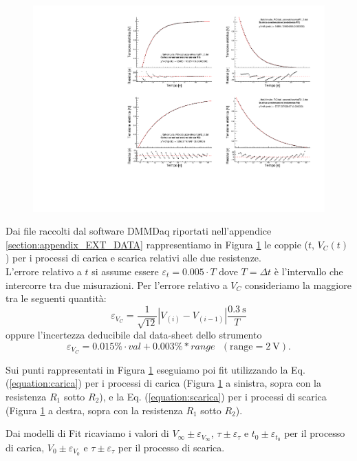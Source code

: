 \documentclass[italian, a4paper, 10pt, twocolumn]{../../style/lab_unige}
\newcommand{\reffig}[1]{Figura {\ref{#1}}}%
\newcommand{\refeqn}[1]{Eq. ({\ref{#1}})}%
\newcommand{\mstdErr}[1]{\varepsilon_{#1}}
\begin{document}
    \begin{figure}[t!]
        \centering
        \includegraphics[width=\linewidth]{plot_RC.pdf}
        \caption{}
        \label{figure:plot_RC}
    \end{figure}

    Dai file raccolti dal software DMMDaq riportati nell'appendice \ref{section:appendix_EXT_DATA} rappresentiamo in \reffig{figure:plot_RC} le coppie ($t$, $V_C(t)$) per i processi di carica e scarica relativi alle due resistenze. \\
    L'errore relativo a $t$ si assume essere $\mstdErr{t}=0.005\cdot T$ dove $T=\Delta t$ è l'intervallo che intercorre tra due misurazioni. Per l'errore relativo a $V_C$ consideriamo la maggiore tra le seguenti quantità: 
    \[
        \mstdErr{V_C} = \frac{1}{\sqrt{12}}\left|V_{(i)}-V_{(i-1)}\right|\frac{0.3~\text{s}}{T}  
    \]oppure l'incertezza deducibile dal data-sheet dello strumento
    \[
        \mstdErr{V_C}=0.015\% \cdot val + 0.003\% * range~~~(\text{range}=2~\text{V}).
    \]

    Sui punti rappresentati in \reffig{figure:plot_RC} eseguiamo poi fit utilizzando la \refeqn{equation:carica} per i processi di carica (\reffig{figure:plot_RC} a sinistra, sopra con la resistenza $R_1$ sotto $R_2$), e la \refeqn{equation:scarica} per i processi di scarica (\reffig{figure:plot_RC} a destra, sopra con la resistenza $R_1$ sotto $R_2$).

    Dai modelli di Fit ricaviamo i valori di $V_\infty\pm\mstdErr{V_\infty}$, $\tau\pm\mstdErr{\tau}$ e $t_0\pm\mstdErr{t_0}$ per il processo di carica, $V_0\pm\mstdErr{V_0}$ e $\tau\pm\mstdErr{\tau}$ per il processo di scarica.
\end{document}
